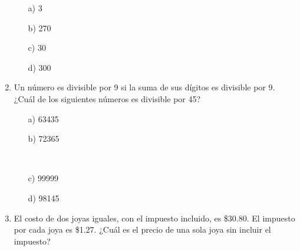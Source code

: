 \documentclass[10.5pt,letterpaper]{article}
\begin{document}
\begin{multicols}{2}
\begin{enumerate}
\begin{minipage}{0.24\linewidth}
\begin{enumerate}
\item[a)] 3
\end{enumerate}
\end{minipage}
\begin{minipage}{0.24\linewidth}
\begin{enumerate}
\item[b)] 270
\end{enumerate}
\end{minipage}
\begin{minipage}{0.24\linewidth}
\begin{enumerate}
\item[c)] 30
\end{enumerate}
\end{minipage}
\begin{minipage}{0.24\linewidth}
\begin{enumerate}
\item[d)] 300
\end{enumerate}
\end{minipage}
\item Un número es divisible por 9 si la suma de sus dígitos es divisible por 9. ¿Cuál de los siguientes
números es divisible por 45?\\ 

\begin{minipage}{0.28\linewidth}
\begin{enumerate}
\item[a)] 63435
\end{enumerate}
\end{minipage}
\begin{minipage}{0.28\linewidth}
\begin{enumerate}
\item[b)] 72365
\end{enumerate}
\end{minipage}\\
\begin{minipage}{0.28\linewidth}
\begin{enumerate}
\item[c)] 99999
\end{enumerate}
\end{minipage}
\begin{minipage}{0.28\linewidth}
\begin{enumerate}
\item[d)] 98145
\end{enumerate}
\end{minipage}
\item El costo de dos joyas iguales, con el impuesto incluido, es \$30.80. El impuesto por cada joya es \$1.27. ¿Cuál es el precio de una sola joya sin incluir el impuesto?\\


\end{enumerate}
\end{multicols}
\end{document}
